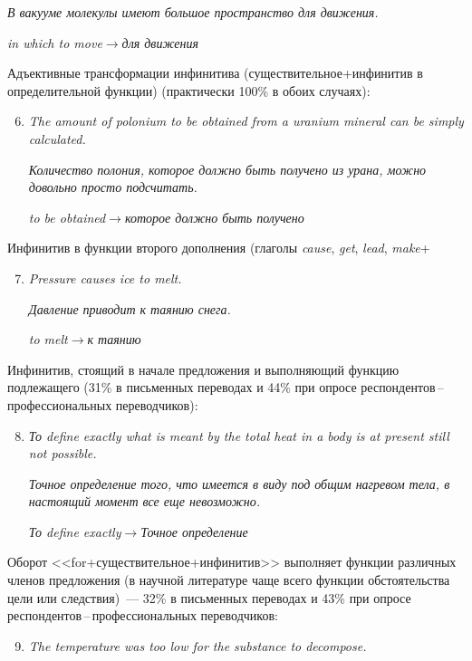 \begin{multicols}{2}
\begin{enumerate}[(1)]
\textit{В вакууме молекулы имеют большое пространство для
движения.}

\textit{in which to move}\;$\rightarrow$\;\textit{для движения}
\end{enumerate}

{\sf Адъективные трансформации инфинитива (существительное\;+\;инфинитив в 
определительной функции) (практически 100\% в обоих случаях):}
\begin{enumerate}[(1)]
\setcounter{enumi}{5}
\item \textit{The amount of polonium to be obtained from a uranium
mineral can be simply calculated.}

\textit{Количество полония, которое должно быть получено из урана,
можно довольно просто подсчитать. }

\textit{to be obtained}\;$\rightarrow$\;\textit{которое должно быть
получено}
\end{enumerate}

{\sf Инфинитив в функции второго дополнения (глаголы} \textit{cause},
\textit{get}, \textit{lead}, \textit{make}\;+
\begin{enumerate}[(1)]
\setcounter{enumi}{6}
\item \textit{Pressure causes ice to melt.}

\textit{Давление приводит к таянию снега.}

\textit{to melt}\;$\rightarrow$\;\textit{к таянию}
\end{enumerate}

{\sf Инфинитив, стоящий в начале предложения и выполняющий функцию подлежащего 
(31\% в письменных переводах и 44\% при опросе 
рес\-пон\-ден\-тов\,--\,про\-фес\-сио\-наль\-ных переводчиков):}
\begin{enumerate}[(1)]
\setcounter{enumi}{7}
\item \textit{То define exactly what is meant by the total heat in a body is
at present still not possible.}

\textit{Точное определение того, что имеется в виду под общим
нагревом тела, в настоящий момент все еще невозможно.}

\textit{То define exactly}\;$\rightarrow$\;\textit{Точное определение}
\end{enumerate}

{\sf Оборот <<for\;+\;существительное\;+\;инфинитив>> выполняет функции 
различных членов предложения (в научной литературе чаще всего функции 
обстоятельства цели или следствия)~--- 32\% в письменных переводах и 43\% при 
опросе рес\-пон\-ден\-тов\,--\,про\-фес\-сио\-наль\-ных переводчиков:}
\begin{enumerate}[(1)]
\setcounter{enumi}{8}
\item \textit{The temperature was too low for the substance to
decompose.}


\end{enumerate}
\end{multicols}
